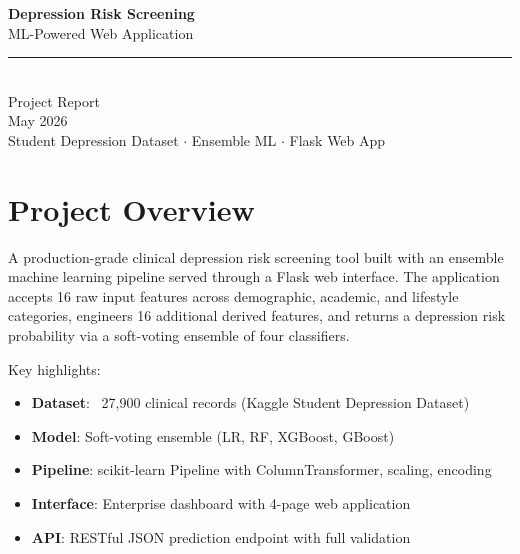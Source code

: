 \documentclass[11pt,a4paper]{article}
\begin{document}
\begin{titlepage}
\centering
\vspace*{4cm}
{\Huge\bfseries\color{primary} Depression Risk Screening}\\[12pt]
{\Large ML-Powered Web Application}\\[24pt]
\rule{0.6\textwidth}{1pt}\\[24pt]
{\large Project Report}\\[12pt]
{\normalsize\textcolor{muted}{May 2026}}\\[4cm]

\vfill
{\normalsize\textcolor{muted}{Student Depression Dataset \;$\cdot$\; Ensemble ML \;$\cdot$\; Flask Web App}}
\end{titlepage}

\newpage
\tableofcontents
\newpage

\section{Project Overview}

A production-grade clinical depression risk screening tool built with an ensemble machine learning pipeline served through a Flask web interface. The application accepts 16 raw input features across demographic, academic, and lifestyle categories, engineers 16 additional derived features, and returns a depression risk probability via a soft-voting ensemble of four classifiers.

Key highlights:
\begin{itemize}[nosep]
    \item \textbf{Dataset}: ~27,900 clinical records (Kaggle Student Depression Dataset)
    \item \textbf{Model}: Soft-voting ensemble (LR, RF, XGBoost, GBoost)
    \item \textbf{Pipeline}: scikit-learn Pipeline with ColumnTransformer, scaling, encoding
    \item \textbf{Interface}: Enterprise dashboard with 4-page web application
    \item \textbf{API}: RESTful JSON prediction endpoint with full validation
\end{itemize}
\end{document}
